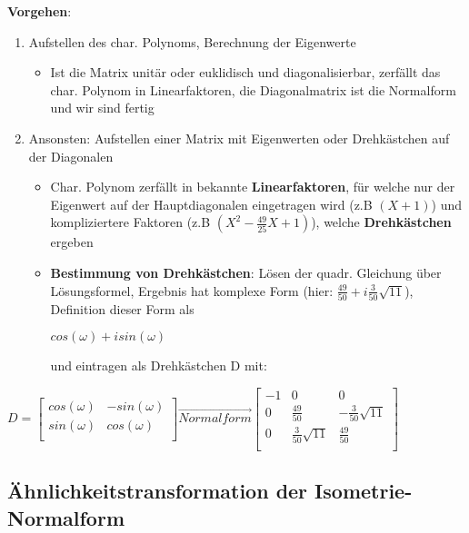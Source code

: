 \textbf{Vorgehen}:
\begin{enumerate}
	\item Aufstellen des char. Polynoms, Berechnung der Eigenwerte
	\begin{itemize}
		\item Ist die Matrix unitär oder euklidisch und diagonalisierbar, zerfällt das char. Polynom in Linearfaktoren, die Diagonalmatrix ist die Normalform und wir sind fertig
	\end{itemize}
	\item Ansonsten: Aufstellen einer Matrix mit Eigenwerten oder Drehkästchen auf der Diagonalen
	\begin{itemize}
		\item Char. Polynom zerfällt in bekannte \textbf{Linearfaktoren}, für welche nur der Eigenwert auf der Hauptdiagonalen eingetragen wird (z.B $(X + 1)$) und kompliziertere Faktoren (z.B $(X^2 - \frac{49}{25}X + 1)$), welche \textbf{Drehkästchen} ergeben
		\item \textbf{Bestimmung von Drehkästchen}: Lösen der quadr. Gleichung über Lösungsformel, Ergebnis hat komplexe Form (hier: $\frac{49}{50} + i\frac{3}{50}\sqrt{11}$), Definition dieser Form als
		\begin{center}
			$cos(\omega) + isin(\omega)$
		\end{center}
		und eintragen als Drehkästchen D mit:
	\end{itemize}
\end{enumerate}
	\begin{center}
	$D = \begin{bmatrix}
		cos(\omega) & -sin(\omega)\\
		sin(\omega) & cos(\omega)\\
	\end{bmatrix}
\overrightarrow{Normalform}
	\begin{bmatrix}
		-1 & 0 & 0 \\
		0 & \frac{49}{50} & -\frac{3}{50}\sqrt{11}\\
		0 & \frac{3}{50}\sqrt{11} & \frac{49}{50}\\
	\end{bmatrix}$
\end{center}

\subsection{Ähnlichkeitstransformation der Isometrie-Normalform}%
\label{os:sub:aehnlichkeitstransformation_der_isometrie_normalform}

